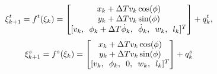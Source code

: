 \begin{equation}
    \begin{split}
        \xi_{k+1}^t
        = f^{t}(\xi_{k}) &= 
            \begin{bmatrix}
                x_k + \Delta T v_k\cos(\phi) \\
                y_k + \Delta T v_k\sin(\phi) \\
                [v_k, \enskip
                \phi_k + \Delta T \dot{\phi}_{k}, \enskip
                \dot{\phi}_{k}, \enskip
                w_k, \enskip
                l_k]^T
            \end{bmatrix} + q^t_k,
    \end{split}
\end{equation}
\begin{equation}
    \begin{split}
        \xi_{k+1}^s
        = f^{s}(\xi_{k}) &=
            \begin{bmatrix}
                x_k + \Delta T v_k\cos(\phi) \\
                y_k + \Delta T v_k\sin(\phi) \\
                [v_k, \enskip
                \phi_k, \enskip
                0, \enskip
                w_k, \enskip
                l_k]^T
            \end{bmatrix} + q^{s}_{k}
    \end{split}
\end{equation}

